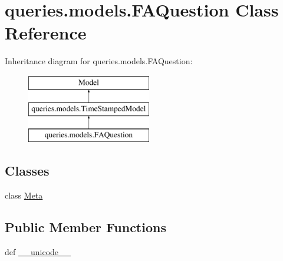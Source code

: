 \hypertarget{classqueries_1_1models_1_1_f_a_question}{\section{queries.\-models.\-F\-A\-Question Class Reference}
\label{classqueries_1_1models_1_1_f_a_question}
}
Inheritance diagram for queries.\-models.\-F\-A\-Question\-:\begin{figure}[H]
\begin{center}
\leavevmode
\includegraphics[height=3.000000cm]{classqueries_1_1models_1_1_f_a_question}
\end{center}
\end{figure}
\subsection*{Classes}
\begin{DoxyCompactItemize}
\item 
class \hyperlink{classqueries_1_1models_1_1_f_a_question_1_1_meta}{Meta}
\end{DoxyCompactItemize}
\subsection*{Public Member Functions}
\begin{DoxyCompactItemize}
\item 
def \hyperlink{classqueries_1_1models_1_1_f_a_question_abcc488229a012a363c9f2074d91d1a79}{\-\_\-\-\_\-unicode\-\_\-\-\_\-}
\end{DoxyCompactItemize}
